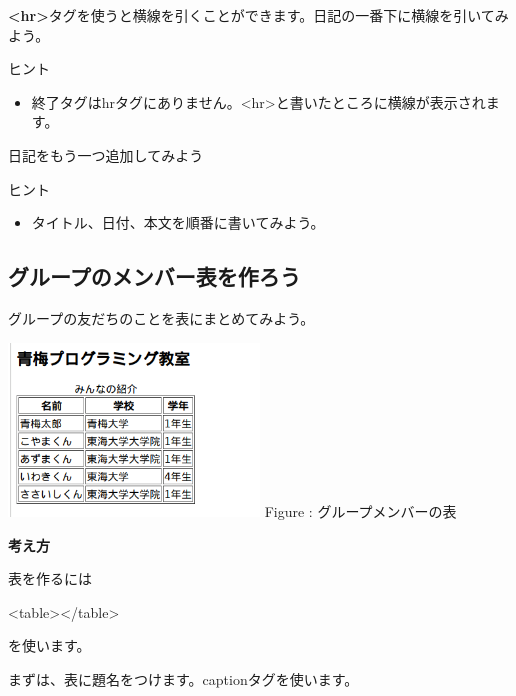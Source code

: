 \documentclass[a4paper,12pt]{jarticle}
\begin{document}
\theQuestion\label{Q:hasAnswer04-8}
\textbf{{\textless}hr{\textgreater}}タグを使うと横線を引くことができます。日記の一番下に横線を引いてみよう。

ヒント

\begin{itemize}
  \item
        終了タグはhrタグにありません。{\textless}hr{\textgreater}と書いたところに横線が表示されます。
\end{itemize}
\theQuestion\label{Q:hasAnswer04-9}

日記をもう一つ追加してみよう

ヒント

\begin{itemize}
  \item
        タイトル、日付、本文を順番に書いてみよう。
\end{itemize}
\clearpage
{}
\subsection{\theExercise グループのメンバー表を作ろう}
グループの友だちのことを表にまとめてみよう。

\centering
\begin{minipage}{\textwidth}
  {\upshape
    \includegraphics[width=0.5\textwidth]{textbook-img189.png}
    \newline
    Figure : グループメンバーの表}
\end{minipage}

\bigskip

\flushleft
\textbf{考え方}



表を作るには

{\textless}table{\textgreater}{\textless}/table{\textgreater}

を使います。

まずは、表に題名をつけます。captionタグを使います。
\end{document}
